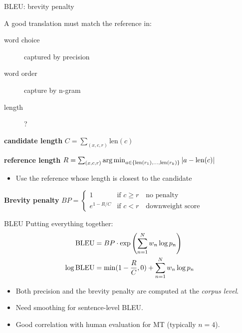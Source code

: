 \documentclass[usenames,dvipsnames,notes,11pt,aspectratio=169,hyperref={colorlinks=true, linkcolor=blue}]{beamer}
\begin{document}
\begin{frame}
    {BLEU: brevity penalty}

    A good translation must match the reference in:\\
    \begin{description}
        \item[word choice] captured by precision
        \item[word order] capture by n-gram
        \item[length] ?
    \end{description}

    \textbf{candidate length} $C=\sum_{(x,c,r)} \text{len}(c)$

    \textbf{reference length} $R=\sum_{(x,c,r)} \operatorname*{arg\,min}_{a\in\left\{ \text{len}(r_1),\ldots,\text{len}(r_k) \right\}} |a-\text{len}(c)|$\\
    \begin{itemize}
        \item Use the reference whose length is closest to the candidate
    \end{itemize}

    \textbf{Brevity penalty} $BP =
    \begin{cases}
        1 & \text{if } c \ge r \quad \text{no penalty}\\
        e^{1-R/C} & \text{if } c < r \quad \text{downweight score}
    \end{cases}
    $
\end{frame}

\begin{frame}
    {BLEU}
    Putting everything together:
    \begin{align*}
        \text{BLEU} &= BP\cdot \exp\left( \sum_{n=1}^N w_n \log p_n \right) \\
        \log \text{BLEU} &= \min(1-\frac{R}{C}, 0) + \sum_{n=1}^N w_n \log p_n
    \end{align*}

    \begin{itemize}
        \item Both precision and the brevity penalty are computed at the \emph{corpus level}.
        \item Need smoothing for sentence-level BLEU.
        \item Good correlation with human evaluation for MT (typically $n=4$).
    \end{itemize}
\end{frame}
\end{document}
